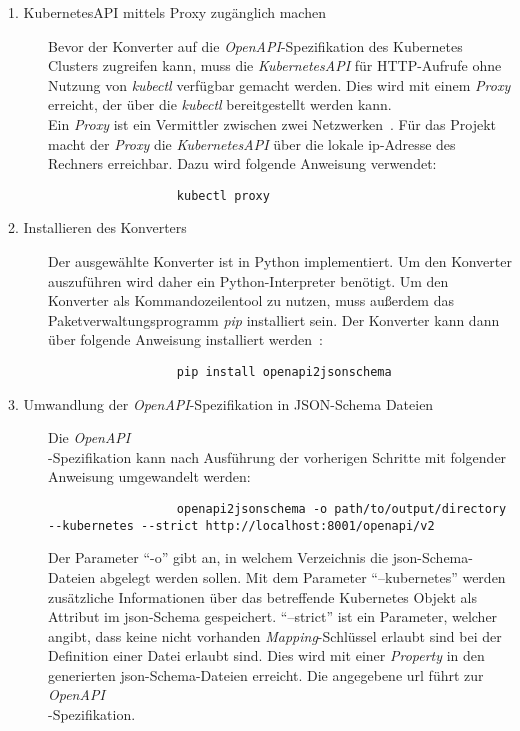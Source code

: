 \begin{description}
      \item[1. KubernetesAPI mittels Proxy zugänglich machen]
            Bevor der Konverter auf die \textit{OpenAPI}-Spezifikation des Kubernetes Clusters zugreifen kann, muss die \textit{KubernetesAPI}
            für HTTP-Aufrufe ohne Nutzung von \textit{kubectl} verfügbar gemacht werden. Dies wird mit einem \textit{Proxy} erreicht, der über die \textit{kubectl}
            bereitgestellt werden kann. \\
            Ein \textit{Proxy} ist ein Vermittler zwischen zwei Netzwerken~\cite{proxy-ryte-wiki,proxy-it-service-network}.
            Für das Projekt macht der \textit{Proxy} die \textit{KubernetesAPI} über die lokale \acs{ip}-Adresse des Rechners erreichbar.
            Dazu wird folgende Anweisung verwendet:
            \begin{verbatim}
                  kubectl proxy
            \end{verbatim}
      \item[2. Installieren des Konverters]
            Der ausgewählte Konverter ist in Python implementiert. Um den Konverter auszuführen wird daher ein Python-Interpreter benötigt.
            Um den Konverter als Kommandozeilentool zu nutzen, muss außerdem das Paketverwaltungsprogramm \textit{pip} installiert sein.
            Der Konverter kann dann über folgende Anweisung installiert werden~\cite{openapi-to-json-schema}:
            \begin{verbatim}
                  pip install openapi2jsonschema
            \end{verbatim}
      \item[3. Umwandlung der \textit{OpenAPI}-Spezifikation in JSON-Schema Dateien]
            Die \textit{OpenAPI}\\-Spezifikation kann nach Ausführung der vorherigen Schritte mit folgender Anweisung umgewandelt werden:
            \begin{verbatim}
                  openapi2jsonschema -o path/to/output/directory --kubernetes --strict http://localhost:8001/openapi/v2
            \end{verbatim}
            Der Parameter ``-o'' gibt an, in welchem Verzeichnis die \ac{json}-Schema-Dateien abgelegt werden sollen.
            Mit dem Parameter ``--kubernetes'' werden zusätzliche Informationen über das betreffende Kubernetes Objekt als Attribut im \ac{json}-Schema gespeichert.
            ``--strict'' ist ein Parameter, welcher angibt, dass keine nicht vorhanden \textit{Mapping}-Schlüssel erlaubt sind bei der Definition einer Datei erlaubt sind.
            Dies wird mit einer \textit{Property} in den generierten \ac{json}-Schema-Dateien erreicht.
            Die angegebene \ac{url} führt zur \textit{OpenAPI}\\-Spezifikation.
\end{description}

